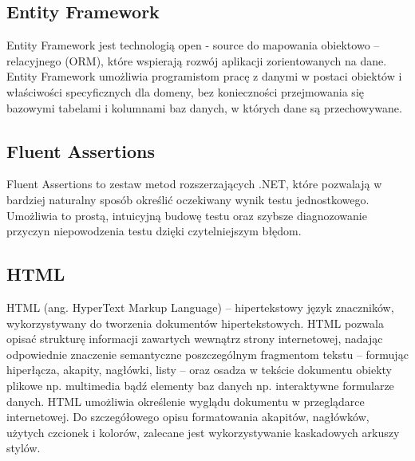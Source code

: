 \documentclass[12pt,a4paper]{article}
\begin{document}
		\subsection{Entity Framework}		 
		 	\indent Entity Framework jest technologią open - source do mapowania obiektowo – relacyjnego (ORM), które wspierają rozwój aplikacji zorientowanych na dane.
		 	Entity Framework umożliwia programistom pracę z danymi w postaci obiektów i właściwości specyficznych dla domeny, bez konieczności przejmowania się bazowymi
		 	tabelami i kolumnami baz danych, w których dane są przechowywane. 

		\subsection{Fluent Assertions}
			\indent Fluent Assertions to zestaw metod rozszerzających .NET, które pozwalają
			w bardziej naturalny sposób określić oczekiwany wynik testu jednostkowego.
			Umożliwia to prostą, intuicyjną budowę testu oraz szybsze diagnozowanie przyczyn
			niepowodzenia testu dzięki czytelniejszym błędom.
		
		\subsection{HTML}
			\indent HTML (ang. HyperText Markup Language) – hipertekstowy język znaczników, wykorzystywany do tworzenia dokumentów hipertekstowych. HTML pozwala opisać
				strukturę informacji zawartych wewnątrz strony internetowej, nadając odpowiednie znaczenie semantyczne poszczególnym fragmentom tekstu – formując hiperłącza,
				akapity, nagłówki, listy – oraz osadza w tekście dokumentu obiekty plikowe np. multimedia bądź elementy baz danych np. interaktywne formularze danych.
				HTML umożliwia określenie wyglądu dokumentu w przeglądarce internetowej. Do szczegółowego opisu formatowania akapitów, nagłówków, użytych czcionek i kolorów,
				zalecane jest wykorzystywanie kaskadowych arkuszy stylów.
		
\end{document}
